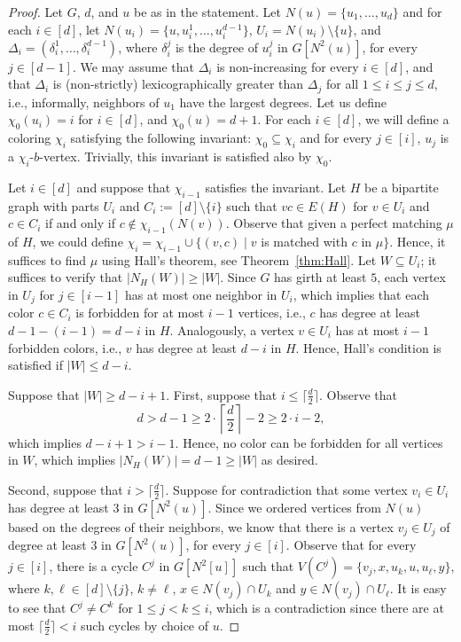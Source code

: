 \documentclass[runningheads, envcountsame]{llncs}
\newcommand{\sep}{\;|\;}
\newcommand{\seq}{\subseteq}
\begin{document}
\begin{theorem}
\thmd
\end{theorem}
\begin{proof}
Let $G$, $d$, and $u$ be as in the statement.
Let $N(u) = \{u_1, \ldots, u_d\}$ and for each $i \in [d]$, let $N(u_i) = \{u, u_i^1, \ldots, u_i^{d-1}\}$, $U_i = N(u_i) \setminus \{u\}$, and $\Delta_i = (\delta_i^1, \ldots, \delta_i^{d-1})$, where $\delta_i^j$ is the degree of $u_i^j$ in $G[N^2(u)]$, for every $j \in [d-1]$.
We may assume that $\Delta_i$ is non-increasing for every $i \in [d]$, and that $\Delta_i$ is (non-strictly) lexicographically greater than $\Delta_j$ for all $1 \le i \le j \le d$, i.e., informally, neighbors of $u_1$ have the largest degrees.
Let us define $\chi_0(u_i) = i$ for $i \in [d]$, and $\chi_0(u) = d+1$.
For each $i \in [d]$, we will define a coloring $\chi_i$ satisfying the following invariant: $\chi_0 \seq \chi_i$ and for every $j \in [i]$, $u_j$ is a $\chi_i$-$b$-vertex.
Trivially, this invariant is satisfied also by $\chi_0$.

Let $i \in [d]$ and suppose that $\chi_{i-1}$ satisfies the invariant.
Let $H$ be a bipartite graph with parts $U_i$ and $C_i := [d] \setminus \{i\}$ such that $vc \in E(H)$ for $v \in U_i$ and $c \in C_i$ if and only if $c \notin \chi_{i-1}(N(v))$.
Observe that given a perfect matching $\mu$ of $H$, we could define $\chi_i = \chi_{i-1} \cup \{(v, c) \sep v$ is matched with $c$ in $\mu\}$.
Hence, it suffices to find $\mu$ using Hall's theorem, see Theorem~\ref{thm:Hall}.
Let $W \seq U_i$; it suffices to verify that $|N_H(W)| \ge |W|$.
Since $G$ has girth at least $5$, each vertex in $U_j$ for $j \in [i-1]$ has at most one neighbor in $U_i$, which implies that each color $c \in C_i$ is forbidden for at most $i-1$ vertices, i.e., $c$ has degree at least $d-1-(i-1) = d-i$ in $H$.
Analogously, a vertex $v \in U_i$ has at most $i-1$ forbidden colors, i.e., $v$ has degree at least $d-i$ in $H$.
Hence, Hall's condition is satisfied if $|W| \le d-i$.

Suppose that $|W| \ge d-i+1$. First, suppose that $i \le \lceil \frac{d}{2} \rceil$.
Observe that \[d > d-1 \ge 2\cdot  \left\lceil \frac{d}{2} \right\rceil - 2 \ge 2\cdot i -2,\] which implies $d-i+1 > i-1$.
Hence, no color can be forbidden for all vertices in $W$, which implies $|N_H(W)| = d-1 \ge |W|$ as desired.

Second, suppose that $i > \lceil \frac{d}{2} \rceil$.
Suppose for contradiction that some vertex $v_i \in U_i$ has degree at least 3 in $G[N^2(u)]$.
Since we ordered vertices from $N(u)$ based on the degrees of their neighbors, we know that there is a vertex $v_j \in U_j$ of degree at least 3 in $G[N^2(u)]$, for every $j \in [i]$.
Observe that for every $j \in [i]$, there is a cycle $C^j$ in $G[N^2[u]]$ such that $V(C^j) = \{v_j, x, u_k, u, u_\ell, y\}$, where $k, \ell  \in [d] \setminus \{j\}$, $k \ne \ell$, $x\in N(v_j) \cap U_k$ and $y \in N(v_j) \cap U_\ell$.
It is easy to see that $C^j \ne C^k$ for $1 \le j < k \le i$, which is a contradiction since there are at most $\lceil \frac{d}{2} \rceil < i$ such cycles by choice of $u$.


\end{proof}
\end{document}
